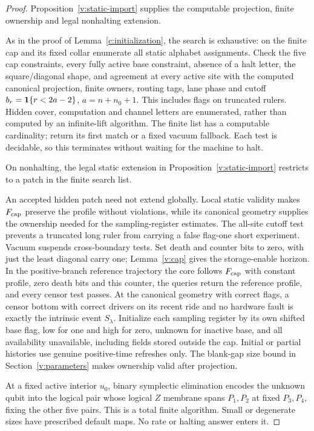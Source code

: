 \begin{proof}
Proposition~\ref{v:static-import} supplies the computable projection, finite ownership and legal nonhalting extension.

As in the proof of Lemma~\ref{c:initialization}, the search is
exhaustive: on the finite cap and its fixed collar enumerate all static alphabet
assignments. Check the five cap constraints, every fully active base
constraint, absence of a halt letter, the square/diagonal shape, and
agreement at every active site with the computed canonical projection,
finite owners, routing tags, lane phase and cutoff
\(b_r=\mathbf 1\{r<2a-2\}\), \(a=n+n_0+1\). This includes flags on
truncated rulers. Hidden cover, computation and channel letters are
enumerated, rather than computed by an infinite-lift algorithm. The
finite list has a computable cardinality; return its first match or a
fixed vacuum fallback. Each test is decidable, so this terminates
without waiting for the machine to halt.

On nonhalting, the legal static extension in Proposition~\ref{v:static-import} restricts to a patch in the finite search list.

An accepted hidden patch need not extend globally. Local static validity
makes \(F_{\rm cap}\) preserve the profile without violations, while
its canonical geometry supplies the ownership needed for the sampling-register
estimates. The all-site cutoff test prevents a truncated long ruler
from carrying a false flag-one short experiment. Vacuum suspends
cross-boundary tests. Set death and counter bits to zero, with just the
least diagonal carry one; Lemma~\ref{v:cap} gives the storage-enable horizon.
In the positive-branch reference trajectory the core follows
\(F_{\rm cap}\) with constant profile, zero death bits and this counter,
the queries return the reference profile, and every censor test passes.
At the canonical geometry with correct flags, a censor bottom with
correct drivers on its recent ride and no hardware fault is exactly
the intrinsic event \(S_\lambda\).
Initialize each sampling register by its own shifted base flag, low for one and
high for zero, unknown for inactive base, and all availability
unavailable, including fields stored outside the cap. Initial or partial
histories use genuine positive-time refreshes only. The blank-gap size
bound in Section~\ref{v:parameters} makes ownership valid after projection.

At a fixed active interior \(u_0\), binary symplectic elimination
encodes the unknown qubit into the logical pair whose logical \(Z\)
membrane spans \(P_1,P_2\) at fixed \(P_3,P_4\), fixing the other five
pairs. This is a total finite algorithm. Small or degenerate sizes have
prescribed default maps. No rate or halting answer enters it.
\end{proof}

